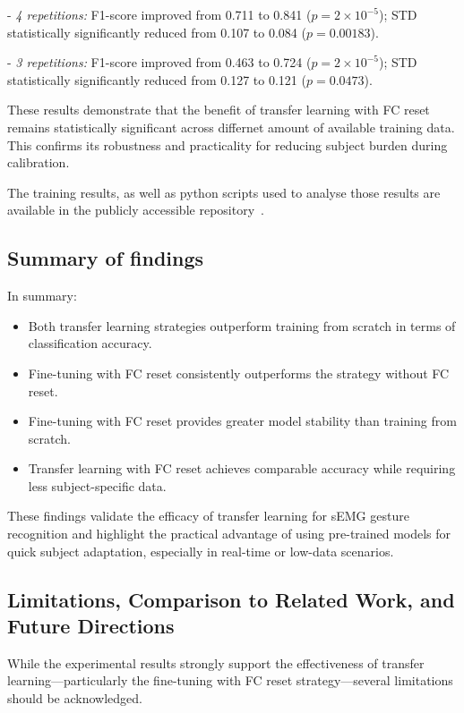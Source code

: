 \begin{multicols}{2}
- \textit{4 repetitions:} F1-score improved from 0.711 to 0.841 ($p = 2 \times 10^{-5}$); STD statistically significantly reduced from 0.107 to 0.084 ($p = 0.00183$).

- \textit{3 repetitions:} F1-score improved from 0.463 to 0.724 ($p = 2 \times 10^{-5}$); STD statistically significantly reduced from 0.127 to 0.121 ($p = 0.0473$). \newline

These results demonstrate that the benefit of transfer learning with FC reset remains statistically significant across differnet amount of available training data. This confirms its robustness and practicality for reducing subject burden during calibration.

The training results, as well as python scripts used to analyse those results are available in the publicly accessible repository~\cite{Kolomiiets2025}.

\subsection*{Summary of findings}

In summary:
\begin{itemize}
    \item Both transfer learning strategies outperform training from scratch in terms of classification accuracy.
    \item Fine-tuning with FC reset consistently outperforms the strategy without FC reset.
    \item Fine-tuning with FC reset provides greater model stability than training from scratch.
    \item Transfer learning with FC reset achieves comparable accuracy while requiring less subject-specific data.
\end{itemize}

These findings validate the efficacy of transfer learning for sEMG gesture recognition and highlight the practical advantage of using pre-trained models for quick subject adaptation, especially in real-time or low-data scenarios.

\subsection*{Limitations, Comparison to Related Work, and Future Directions}

While the experimental results strongly support the effectiveness of transfer learning—particularly the fine-tuning with FC reset strategy—several limitations should be acknowledged.


\end{multicols}
